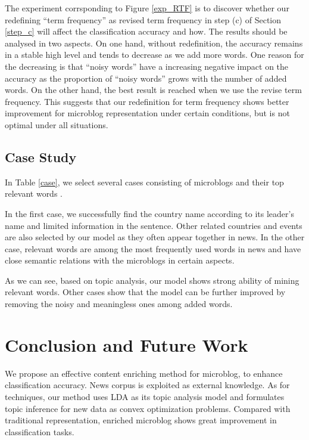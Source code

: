 \documentclass[11pt]{article}
\begin{document}
The experiment corrsponding to Figure \ref{exp_RTF} is to discover whether our redefining ``term frequency'' as revised term frequency in step (c) of Section \ref{step_c} will affect the classification accuracy and how. The results should be analysed in two aspects. On one hand, without redefinition, the accuracy remains in a stable high level and tends to decrease as we add more words. One reason for the decreasing is that ``noisy words'' have a increasing negative impact on the accuracy as the proportion of ``noisy words'' grows with the number of added words. On the other hand, the best result is reached when we use the revise term frequency. This suggests that our redefinition for term frequency shows better improvement for microblog representation under certain conditions, but is not optimal under all situations.

\subsection{Case Study}

In Table \ref{case}, we select several cases consisting of microblogs and their top relevant words .

In the first case, we successfully find the country name according to its leader's name and limited information in the sentence. Other related countries and events are also selected by our model as they often appear together in news. In the other case, relevant words are among the most frequently used words in news and have close semantic relations with the microblogs in certain aspects. 

As we can see, based on topic analysis, our model shows strong ability of mining relevant words. Other cases show that the model can be further improved by removing the noisy and meaningless ones among added words. 

\section{Conclusion and Future Work}

We propose an effective content enriching method for microblog, to enhance classification accuracy. News corpus is exploited as external knowledge. As for techniques, our method uses LDA as its topic analysis model and formulates topic inference for new data as convex optimization problems. Compared with traditional representation, enriched microblog shows great improvement in classification tasks.
\end{document}
